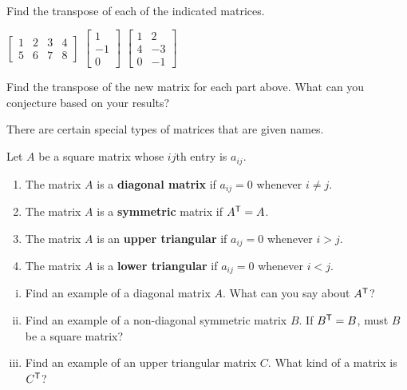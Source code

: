 \begin{activity} \label{act:A2.1_4} ~
    \ba
    \item Find the transpose of each of the indicated matrices.

$\!\!\!\!\!\!\! \left[ \begin{array}{cccc}
1 & 2   & 3   & 4   \\
5 & 6  & 7   & 8
\end{array} \right]$ \hspace{1cm} $\left[ \begin{array}{r}
1 \\ -1  \\ 0 \end{array} \right]$ \hspace{1cm} $\left[ \begin{array}{cr}
1 &2 \\ 4 & -3 \\ 0 &-1 \end{array} \right]$ 

    

\item Find the transpose of the new matrix for each part above. What can you conjecture based on your results?

\item There are certain special types of matrices that are given names. 

\begin{definition} \label{def:special_matrices} Let $A$ be a square matrix whose $ij$th entry is $a_{ij}$. 
	\begin{enumerate}
	\item The matrix $A$ is a \textbf{diagonal matrix} if $a_{ij} = 0$ whenever $i \neq j$.
	\item The matrix $A$ is a \textbf{symmetric} matrix if $A^{\mathsf{T}} = A$.
	\item The matrix $A$ is an \textbf{upper triangular} if $a_{ij} = 0$ whenever $i > j$.
	\item The matrix $A$ is a \textbf{lower triangular} if $a_{ij} = 0$ whenever $i < j$.
	\end{enumerate}
\end{definition}
	\begin{enumerate}[i.]
	\item Find an example of a diagonal matrix $A$. What can you say about $A^{\mathsf{T}}$? 
	\item Find an example of a non-diagonal symmetric matrix $B$. If $B^{\mathsf{T}} = B$, must $B$ be a square matrix?  
	\item Find an example of an upper triangular matrix $C$. What kind of a matrix is $C^{\mathsf{T}}$? 
	\end{enumerate}
	
   \ea
\end{activity}


